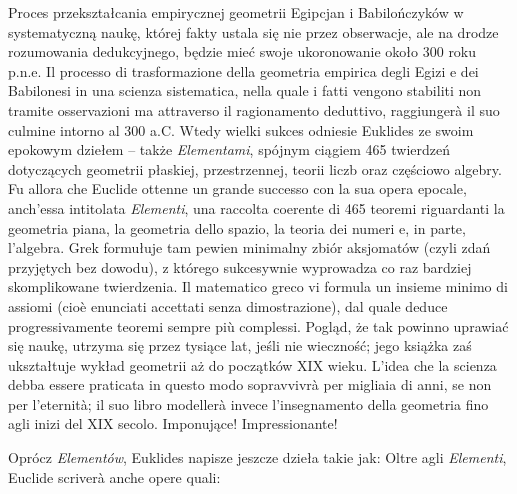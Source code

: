 Proces przekształcania empirycznej geometrii Egipcjan i Babilończyków w systematyczną naukę, której fakty ustala się nie przez obserwacje, ale na drodze rozumowania dedukcyjnego, będzie mieć swoje ukoronowanie około 300 roku p.n.e. %
Il processo di trasformazione della geometria empirica degli Egizi e dei Babilonesi in una scienza sistematica, nella quale i fatti vengono stabiliti non tramite osservazioni ma attraverso il ragionamento deduttivo, raggiungerà il suo culmine intorno al 300 a.C. %
Wtedy wielki sukces odniesie Euklides ze swoim epokowym dziełem -- także \emph{Elementami}, spójnym ciągiem 465 twierdzeń dotyczących geometrii płaskiej, przestrzennej, teorii liczb oraz częściowo algebry. %
Fu allora che Euclide ottenne un grande successo con la sua opera epocale, anch'essa intitolata \emph{Elementi}, una raccolta coerente di 465 teoremi riguardanti la geometria piana, la geometria dello spazio, la teoria dei numeri e, in parte, l'algebra. %
Grek formułuje tam pewien minimalny zbiór aksjomatów (czyli zdań przyjętych bez dowodu), z którego sukcesywnie wyprowadza co raz bardziej skomplikowane twierdzenia. %
Il matematico greco vi formula un insieme minimo di assiomi (cioè enunciati accettati senza dimostrazione), dal quale deduce progressivamente teoremi sempre più complessi. %
Pogląd, że tak powinno uprawiać się naukę, utrzyma się przez tysiące lat, jeśli nie wieczność; jego książka zaś ukształtuje wykład geometrii aż do początków XIX wieku. %
L'idea che la scienza debba essere praticata in questo modo sopravvivrà per migliaia di anni, se non per l'eternità; il suo libro modellerà invece l'insegnamento della geometria fino agli inizi del XIX secolo. %
Imponujące! %
Impressionante! %

Oprócz \emph{Elementów}, Euklides napisze jeszcze dzieła takie jak: %
Oltre agli \emph{Elementi}, Euclide scriverà anche opere quali: %

